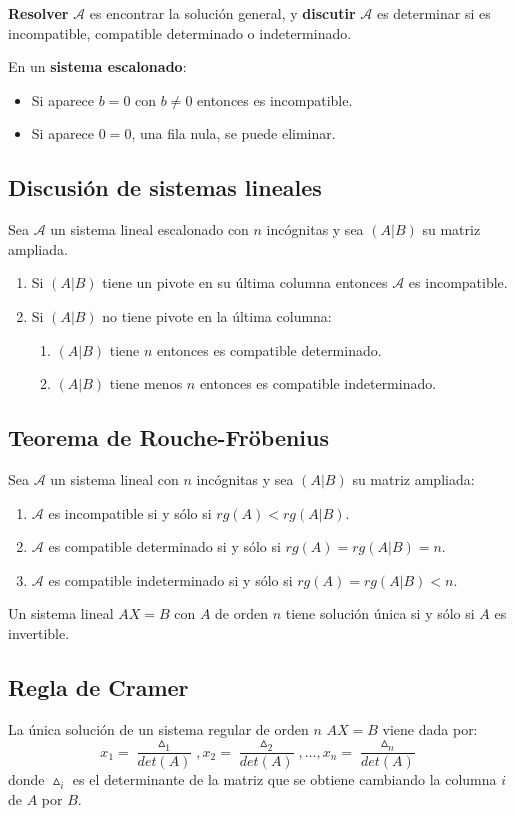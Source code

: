 \textbf{Resolver} $\mathcal{A}$ es encontrar la solución general, y \textbf{discutir} $\mathcal{A}$ es determinar si es incompatible, compatible determinado o indeterminado.

En un \textbf{sistema escalonado}:
\begin{itemize}
\item Si aparece $b=0$ con $b \neq 0$ entonces es incompatible.
\item Si aparece $0=0$, una fila nula, se puede eliminar.
\end{itemize}

\subsection{Discusión de sistemas lineales}

Sea $\mathcal{A}$ un sistema lineal escalonado con $n$ incógnitas y sea $(A|B)$ su matriz ampliada.
\begin{enumerate}
\item Si $(A|B)$ tiene un pivote en su última columna entonces $\mathcal{A}$ es incompatible.
\item Si $(A|B)$ no tiene pivote en la última columna:
\begin{enumerate}
\item $(A|B)$ tiene $n$ entonces es compatible determinado.
\item $(A|B)$ tiene menos $n$ entonces es compatible indeterminado.
\end{enumerate}
\end{enumerate}

\subsection{Teorema de Rouche-Fröbenius}

Sea $\mathcal{A}$ un sistema lineal con $n$ incógnitas y sea $(A|B)$ su matriz ampliada:
\begin{enumerate}
\item $\mathcal{A}$ es incompatible si y sólo si $rg(A) < rg(A|B)$.
\item $\mathcal{A}$ es compatible determinado si y sólo si $rg(A) = rg(A|B) = n$.
\item $\mathcal{A}$ es compatible indeterminado si y sólo si $rg(A) = rg(A|B) < n$.
\end{enumerate}

Un sistema lineal $AX=B$ con $A$ de orden $n$ tiene solución única si y sólo si $A$ es invertible.

\subsection{Regla de Cramer}

La única solución de un sistema regular de orden $n$ $AX=B$ viene dada por:
\[
x_1=\frac{\vartriangle_1}{det(A)}, x_2=\frac{\vartriangle_2}{det(A)}, \ldots, x_n=\frac{\vartriangle_n}{det(A)}
\]
donde $\vartriangle_i$ es el determinante de la matriz que se obtiene cambiando la columna $i$ de $A$ por $B$.